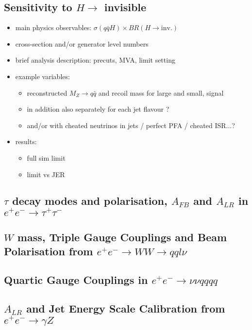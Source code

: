 \subsection{Sensitivity to $H \to $ invisible}
\begin{itemize}
\item main physics observables: $\sigma(q\bar{q} H)\times BR(H \to \mbox{inv.})$
\item cross-section and/or generator level numbers 
\item brief analysis description: precuts, MVA, limit setting
\item example variables:
  \begin{itemize}
     \item reconstructed $M_Z \to q\bar{q}$ and recoil mass for large and small, signal      \item in addition also separately for each jet flavour ?
     \item and/or with cheated neutrinos in jets / perfect PFA / cheated ISR...?
  \end{itemize}
\item results: 
  \begin{itemize}
     \item full sim limit
     \item limit vs JER
  \end{itemize}
\end{itemize}

\subsection{$\tau$ decay modes and polarisation, $A_{FB}$ and $A_{LR}$ in $e^+e^- \to \tau^+\tau^-$}
\subsection{$W$ mass, Triple Gauge Couplings and Beam Polarisation from $e^+e^- \to WW \to qql\nu$}
\subsection{Quartic Gauge Couplings in $e^+e^- \to \nu\nu qqqq$}
\subsection{$A_{LR}$ and Jet Energy Scale Calibration from $e^+e^- \to \gamma Z$}
